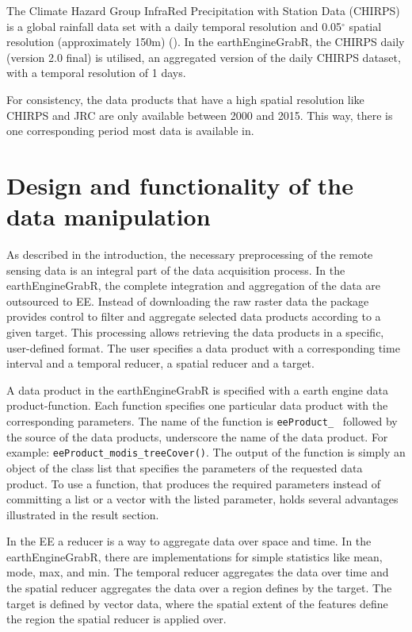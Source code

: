 The Climate Hazard Group InfraRed Precipitation with Station Data (CHIRPS) is a global rainfall data set with a daily temporal resolution and 0.05$^\circ$ spatial resolution (approximately 150m) (\cite{funk2015climate}). In the earthEngineGrabR, the CHIRPS daily (version 2.0 final) is utilised, an aggregated version of the daily CHIRPS dataset, with a temporal resolution of 1 days.

For consistency, the data products that have a high spatial resolution like CHIRPS and JRC are only available between 2000 and 2015. This way, there is one corresponding period most data is available in.

\section{Design and functionality of the \\ data manipulation}

As described in the introduction, the necessary preprocessing of the remote sensing data is an integral part of the data acquisition process. In the earthEngineGrabR, the complete integration and aggregation of the data are outsourced to EE.
Instead of downloading the raw raster data the package provides control to filter and aggregate selected data products according to a given target. This processing allows retrieving the data products in a specific, user-defined format. The user specifies a data product with a corresponding time interval and a temporal reducer, a spatial reducer and a target. 

A data product in the earthEngineGrabR is specified with a earth engine data product-function. Each function specifies one particular data product with the corresponding parameters. The name of the function is \texttt{eeProduct\_ } followed by the source of the data products, underscore the name of the data product. For example: \texttt{eeProduct\_modis\_treeCover()}. The output of the function is simply an object of the class list that specifies the parameters of the requested data product. To use a function, that produces the required parameters instead of committing a list or a vector with the listed parameter, holds several advantages illustrated in the result section.

In the EE a reducer is a way to aggregate data over space and time. In the earthEngineGrabR, there are implementations for simple statistics like mean, mode, max, and min. The temporal reducer aggregates the data over time and the spatial reducer aggregates the data over a region defines by the target. 
The target is defined by vector data, where the spatial extent of the features define the region the spatial reducer is applied over.

